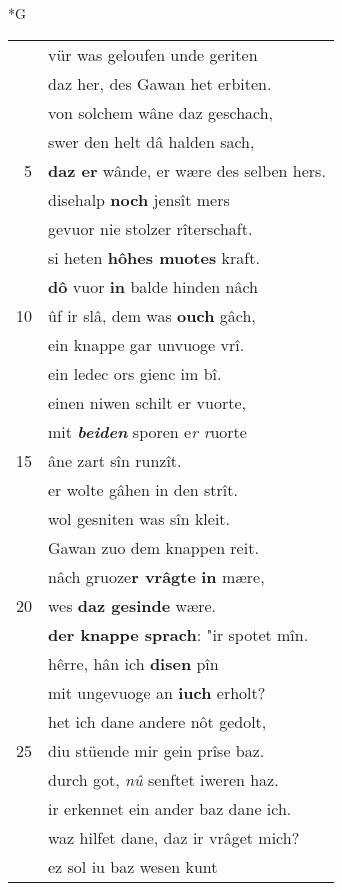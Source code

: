 \documentclass[8pt,a4paper,notitlepage]{article}
\begin{document}
\begin{table}[ht]
\begin{minipage}[t]{0.5\linewidth}
\small
\begin{center}*G
\end{center}
\begin{tabular}{rl}
 & vür was geloufen unde geriten\\ 
 & daz her, des Gawan het erbiten.\\ 
 & von solchem wâne daz geschach,\\ 
 & swer den helt dâ halden sach,\\ 
5 & \textbf{daz er} wânde, er wære des selben hers.\\ 
 & disehalp \textbf{noch} jensît mers\\ 
 & gevuor nie stolzer rîterschaft.\\ 
 & si heten \textbf{hôhes muotes} kraft.\\ 
 & \textbf{dô} vuor \textbf{in} balde hinden nâch\\ 
10 & ûf ir slâ, dem was \textbf{ouch} gâch,\\ 
 & ein knappe gar unvuoge vrî.\\ 
 & ein ledec ors gienc im bî.\\ 
 & einen niwen schilt er vuorte,\\ 
 & mit \textit{\textbf{beiden}} sporen e\textit{r r}uorte\\ 
15 & âne zart sîn runzît.\\ 
 & er wolte gâhen in den strît.\\ 
 & wol gesniten was sîn kleit.\\ 
 & Gawan zuo dem knappen reit.\\ 
 & nâch gruoze\textbf{r vrâgte} \textbf{in} mære,\\ 
20 & wes \textbf{daz gesinde} wære.\\ 
 & \textbf{der knappe sprach}: "ir spotet mîn.\\ 
 & hêrre, hân ich \textbf{disen} pîn\\ 
 & mit ungevuoge an \textbf{iuch} erholt?\\ 
 & het ich dane andere nôt gedolt,\\ 
25 & diu stüende mir gein prîse baz.\\ 
 & durch got, \textit{nû} senftet iweren haz.\\ 
 & ir erkennet ein ander baz dane ich.\\ 
 & waz hilfet dane, daz ir vrâget mich?\\ 
 & ez sol iu baz wesen kunt\\ 

\end{tabular}
\end{minipage}
\end{table}
\end{document}
